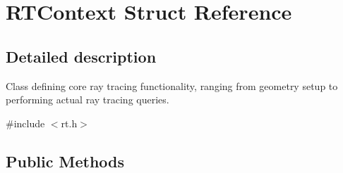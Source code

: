 \hypertarget{struct_r_t_context}{}\section{R\+T\+Context Struct Reference}
\label{struct_r_t_context}


\subsection{Detailed description}
Class defining core ray tracing functionality, ranging from geometry setup to performing actual ray tracing queries. 

{\ttfamily \#include $<$rt.\+h$>$}

\subsection*{Public Methods}
